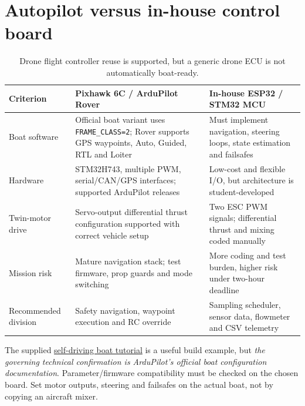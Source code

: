 \documentclass[10pt,a4paper]{article}
\begin{document}
\section{Autopilot versus in-house control board}
\begin{table}[H]\centering\footnotesize
\caption{Drone flight controller reuse is supported, but a generic drone ECU is not automatically boat-ready.}
\begin{tabularx}{\linewidth}{@{}L{3.0cm}YY@{}}\toprule
Criterion & Pixhawk 6C / ArduPilot Rover & In-house ESP32 / STM32 MCU\\\midrule
Boat software & Official boat variant uses \texttt{FRAME\_CLASS=2}; Rover supports GPS waypoints, Auto, Guided, RTL and Loiter \cite{ArduBoat} & Must implement navigation, steering loops, state estimation and failsafes\\
Hardware & STM32H743, multiple PWM, serial/CAN/GPS interfaces; supported ArduPilot releases \cite{Pixhawk6C,PixhawkFirmware} & Low-cost and flexible I/O, but architecture is student-developed\\
Twin-motor drive & Servo-output differential thrust configuration supported with correct vehicle setup & Two ESC PWM signals; differential thrust and mixing coded manually\\
Mission risk & Mature navigation stack; test firmware, prop guards and mode switching & More coding and test burden, higher risk under two-hour deadline\\
Recommended division & Safety navigation, waypoint execution and RC override & Sampling scheduler, sensor data, flowmeter and CSV telemetry\\\bottomrule\end{tabularx}\end{table}
The supplied \href{https://www.instructables.com/Building-a-Self-Driving-Boat-ArduPilot-Rover/}{self-driving boat tutorial} is a useful build example, but \emph{the governing technical confirmation is ArduPilot's official boat configuration documentation}. Parameter/firmware compatibility must be checked on the chosen board. Set motor outputs, steering and failsafes on the actual boat, not by copying an aircraft mixer.
\end{document}
